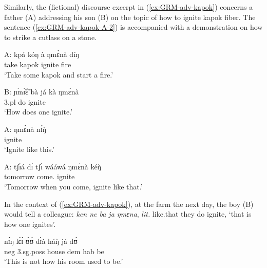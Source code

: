 \begin{exe}
\begin{exe}
\begin{exe}
{\begin{exe}
\begin{exe}
\begin{exe}
\begin{exe}
\begin{exe}
\begin{exe}
\begin{exe}
\begin{xlist}
\begin{exe}
\begin{exe}
\begin{exe}
\begin{exe}
\begin{exe}
\begin{exe}
\begin{exe}
\begin{exe}
\begin{exe}
\begin{exe}
\begin{exe}
\begin{exe}
\begin{exe}
\begin{exe}
\begin{exe}
 
\z 
 \z   

Similarly,  the (fictional) discourse excerpt in
(\ref{ex:GRM-adv-kapok}) concerns a father (A) addressing his son (B) on the
topic of  how to ignite kapok fiber. The sentence (\ref{ex:GRM-adv-kapok-A-2})
is accompanied with a demonstration on how to strike a cutlass on a stone.


\ea\label{ex:GRM-adv-kapok}
 
 
 \ea\label{ex:GRM-adv-kapok-A-1}
\gll A: kpá kóŋ à ŋmɛ̀nà díŋ\\
{}  take kapok {\conn} ignite fire\\
\glt `Take some kapok and start a fire.'

 \ex\label{ex:GRM-adv-kapok-B}
\gll B:  ɲɪ̀nɪ̃̀ɛ̃́ bà já kà ŋmɛ̀nà\\
{} {\q} {\sc 3.pl} do {\egr} ignite\\
\glt `How does one ignite.' 

 \ex\label{ex:GRM-adv-kapok-A-2}
\gll  A: ŋmɛ̀nà nɪ́ŋ̀\\
{} ignite {\dxm}\\
\glt `Ignite like this.'

 \ex\label{ex:GRM-adv-kapok-A-3}
 \gll  A: tʃɪ́á dɪ̀ tʃɪ́ wááwá ŋmɛ̀nà kéŋ̀\\
{} tomorrow {\conn} {\cras} come.{\pfv} ignite {\dxm}\\
\glt `Tomorrow when you come, ignite like that.'
 
\z 
 \z  
 
In the context of (\ref{ex:GRM-adv-kapok}), at the farm the next day, the boy
(B) would tell a colleague: {\it ken ne ba ja ŋmɛna},  {\it lit.} like.that they
do ignite, `that is how one ignites'. 


\ea\label{ex:GRM-ning-prop-2}
 \gll nɪ́ŋ lɛ̀ɪ́ ʊ̀ʊ̀ dɪ̀à háŋ̀ já dʊ̀\\
 {\dxm} {\sc neg}  {\sc 3.sg.poss} house {\sc dem} {\sc hab} be\\
\glt  `This is not how his room used to be.'

\z



\end{exe}
\end{exe}
\end{exe}
\end{exe}
\end{exe}
\end{exe}
\end{exe}
\end{exe}
\end{exe}
\end{exe}
\end{exe}
\end{exe}
\end{exe}
\end{exe}
\end{exe}
\end{xlist}
\end{exe}
\end{exe}
\end{exe}
\end{exe}
\end{exe}
\end{exe}
\end{exe}}
\end{exe}
\end{exe}
\end{exe}
